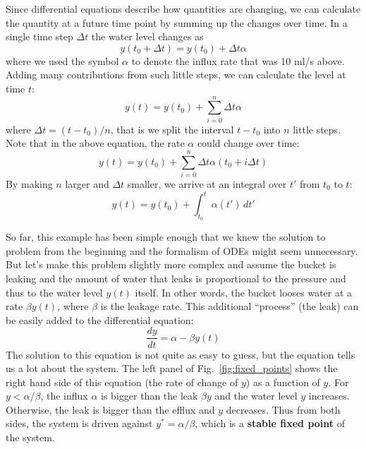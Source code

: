 Since differential equations describe how quantities are changing, we can calculate the quantity at a future time point by summing up the changes over time.
In a single time step $\Delta t$ the water level changes as
\begin{equation}
    \label{eq:ODE_step}
    y(t_0 + \Delta t) = y(t_0) + \Delta t \alpha
\end{equation}
where we used the symbol $\alpha$ to denote the influx rate that was 10 ml/s above.
Adding many contributions from such little steps, we can calculate the level at time $t$:
\begin{equation}
    y(t) = y(t_0) + \sum_{i=0}^n \Delta t \alpha
\end{equation}
where $\Delta t = (t-t_0)/n$, that is we split the interval $t-t_0$ into $n$ little steps.
Note that in the above equation, the rate $\alpha$ could change over time:
\begin{equation}
    y(t) = y(t_0) + \sum_{i=0}^n \Delta t \alpha(t_0 + i\Delta t)
\end{equation}
By making $n$ larger and $\Delta t$ smaller, we arrive at an integral over $t'$ from $t_0$ to $t$:
\begin{equation}
    y(t) = y(t_0) + \int_{t_0}^t \alpha(t')\, dt'
\end{equation}

So far, this example has been simple enough that we knew the solution to problem from the beginning and the formalism of ODEs might seem unnecessary.
But let's make this problem slightly more complex and assume the bucket is leaking and the amount of water that leaks is proportional to the pressure and thus to the water level $y(t)$ itself.
In other words, the bucket looses water at a rate $\beta y(t)$, where $\beta$ is the leakage rate.
This additional ``process'' (the leak) can be easily added to the differential equation:
\begin{equation}
    \label{eq:bucket}
    \frac{dy}{dt} = \alpha - \beta y(t)
\end{equation}
The solution to this equation is not quite as easy to guess, but the equation tells us a lot about the system.
The left panel of Fig.~\ref{fig:fixed_points} shows the right hand side of this equation (the rate of change of $y$) as a function of $y$.
For $y<\alpha/\beta$, the influx $\alpha$ is bigger than the leak $\beta y$ and the water level $y$ increases.
Otherwise, the leak is bigger than the efflux and $y$ decreases.
Thus from both sides, the system is driven against $y^* = \alpha/\beta$, which is a \textbf{stable fixed point} of the system.

